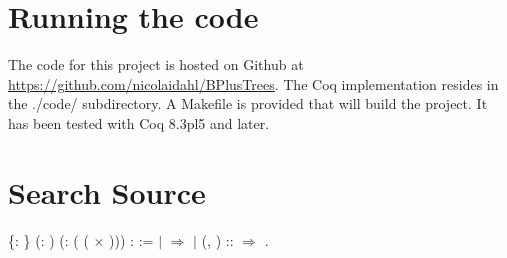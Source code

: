 \appendix
\label{sec:Appendix}
\section{Running the code}
The code for this project is hosted on Github at \url{https://github.com/nicolaidahl/BPlusTrees}. The Coq implementation resides in the ./code/ subdirectory. A Makefile is provided that will build the project. It has been tested with Coq 8.3pl5 and later.

\newpage

\section{Search Source}
\label{sec:SearchSource}

\begin{coqdoccode}
  \{: \} (: ) (: ( ( \ensuremath{\times} ))) :   :=\coqdoceol
\coqdocindent{1.00em}
  \coqdoceol
\coqdocindent{2.00em}
\ensuremath{|}  \ensuremath{\Rightarrow} \coqdoceol
\coqdocindent{2.00em}
\ensuremath{|} (, ) ::  \ensuremath{\Rightarrow}           \coqdoceol
\coqdocindent{1.00em}
.\coqdoceol
\coqdocemptyline
\coqdocnoindent
\end{coqdoccode}

